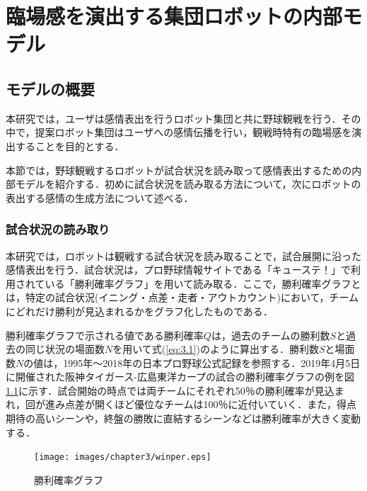 \chapter{臨場感を演出する集団ロボットの内部モデル}
\thispagestyle{fancy} %
\lhead{}
\chead{}
\rhead{}
\lfoot{} 
\cfoot{\thepage}  
\rfoot{}
%

\section{モデルの概要}
\label{sec3.1}

本研究では，ユーザは感情表出を行うロボット集団と共に野球観戦を行う．その中で，提案ロボット集団はユーザへの感情伝播を行い，観戦時特有の臨場感を演出することを目的とする．

本節では，野球観戦するロボットが試合状況を読み取って感情表出するための内部モデルを紹介する．初めに試合状況を読み取る方法について，次にロボットの表出する感情の生成方法について述べる．

\subsection{試合状況の読み取り}
\label{sec3.1.1}    

本研究では，ロボットは観戦する試合状況を読み取ることで，試合展開に沿った感情表出を行う．試合状況は，プロ野球情報サイトである「キューステ！」で利用されている「勝利確率グラフ」を用いて読み取る\cite{kyusute}．ここで，勝利確率グラフとは，特定の試合状況(イニング・点差・走者・アウトカウント)において，チームにどれだけ勝利が見込まれるかをグラフ化したものである．

勝利確率グラフで示される値である勝利確率$Q$は，過去のチームの勝利数$S$と過去の同じ状況の場面数$N$を用いて式(\ref{eq:3.1})のように算出する．勝利数$S$と場面数$N$の値は，1995年～2018年の日本プロ野球公式記録を参照する．2019年4月5日に開催された阪神タイガース-広島東洋カープの試合の勝利確率グラフの例を図\ref{win_percent}に示す．試合開始の時点では両チームにそれぞれ50％の勝利確率が見込まれ，回が進み点差が開くほど優位なチームは100％に近付いていく．また，得点期待の高いシーンや，終盤の勝敗に直結するシーンなどは勝利確率が大きく変動する．

\vspace{1cm}
 \begin{figure}[H]
 \begin{center}
  \centering
  \texttt{[image: images/chapter3/winper.eps]}
  \caption{勝利確率グラフ}
  \label{win_percent}
 \end{center}
\end{figure}


